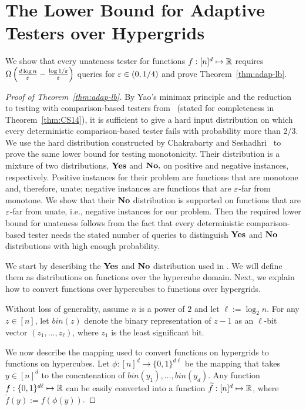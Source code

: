 
\section{The Lower Bound for Adaptive Testers over Hypergrids} \label{sec:adap-lb}
We show that every unateness tester for functions $f:[n]^d \mapsto {\mathbb R}$  requires $\Omega\left(\frac{d \log n}{\varepsilon}-\frac{\log 1/\varepsilon}{\varepsilon}\right)$ queries for $\varepsilon\in(0,1/4)$ and prove Theorem~\ref{thm:adap-lb}.

\begin{proof}[Proof of Theorem~\ref{thm:adap-lb}]
By Yao's minimax principle and the reduction to testing with comparison-based testers from~\cite{Fis04,CS14} (stated for completeness in Theorem~\ref{thm:CS14}), it is sufficient to give a hard input distribution on which every deterministic comparison-based tester fails with probability more than 2/3. We use the hard distribution constructed  by Chakrabarty and Seshadhri~\cite{CS14} to prove the same lower bound for testing monotonicity. Their distribution is a mixture of two distributions, $\mathbf{Yes}$ and $\mathbf {No},$ on positive and negative instances, respectively. Positive instances for their problem are functions that are monotone and, therefore, unate; negative instances are functions that are $\varepsilon$-far from monotone. We show that their $\mathbf {No}$ distribution is supported on functions that are $\varepsilon$-far from unate, i.e., negative instances for our problem. Then the required lower bound for unateness follows from the fact that every deterministic comparison-based tester needs the stated number of queries to distinguish $\mathbf{Yes}$ and $\mathbf {No}$ distributions with high enough probability.

We start by describing the $\mathbf{Yes}$ and $\mathbf {No}$ distribution used in \cite{CS14}. We will define them as distributions on functions over the hypercube domain. Next, we explain how to convert functions over hypercubes  to functions over hypergrids.

Without loss of generality, assume $n$ is a power of $2$ and let $\ell := \log_2 n$.
For any $z \in [n]$, let $bin(z)$ denote the binary representation of $z-1$ as an $\ell$-bit vector $(z_1, \ldots, z_\ell)$, where $z_1$ is the least significant bit.

We now describe the mapping used to convert functions on hypergrids to functions on hypercubes. Let $\phi:[n]^d \to \{0,1\}^{d\ell}$ be the mapping that takes $y\in[n]^d$ to the concatenation of $bin(y_1),\dots,bin(y_d)$. Any function $f:\{0,1\}^{d \ell} \mapsto {\mathbb R}$ can be easily converted into a function $\widetilde{f}:[n]^d \mapsto {\mathbb R}$, where $\widetilde{f}(y) := f(\phi(y))$.


\end{proof}
